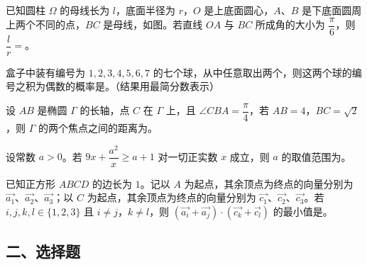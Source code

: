 \begin{question}
已知圆柱 $\Omega$ 的母线长为 $l$，底面半径为 $r$，$O$ 是上底面圆心，$A$、$B$ 是下底面圆周上两个不同的点，$BC$ 是母线，如图。若直线 $OA$ 与 $BC$ 所成角的大小为 $\dfrac{\pi}{6}$，则 $\dfrac lr=$\gkblank{}。
\nopagebreak[4]
\begin{center}\end{center}
\nopagebreak[4]
\end{question}
\endgroup
\begin{question}
盒子中装有编号为 $1,2,3,4,5,6,7$ 的七个球，从中任意取出两个，则这两个球的编号之积为偶数的概率是\gkblank{}。（结果用最简分数表示）

\end{question}
\begin{question}
设 $AB$ 是椭圆 $\Gamma$ 的长轴，点 $C$ 在 $\Gamma$ 上，且 $\angle CBA=\dfrac{\pi}{4}$，若 $AB=4$，$BC=\sqrt2$，则 $\Gamma$ 的两个焦点之间的距离为\gkblank{}。

\end{question}
\begin{question}
设常数 $a>0$。若 $9x+\dfrac{a^2}{x}\geqslant a+1$ 对一切正实数 $x$ 成立，则 $a$ 的取值范围为\gkblank{}。

\end{question}
\begin{question}
已知正方形 $ABCD$ 的边长为 $1$。记以 $A$ 为起点，其余顶点为终点的向量分别为 $\overrightarrow{a_1}$、$\overrightarrow{a_2}$、$\overrightarrow{a_3}$；以 $C$ 为起点，其余顶点为终点的向量分别为 $\overrightarrow{c_1}$、$\overrightarrow{c_2}$、$\overrightarrow{c_3}$。若 $i,j,k,l\in\{1,2,3\}$ 且 $i\neq j$，$k\neq l$，则 $(\overrightarrow{a_i}+\overrightarrow{a_j})\cdot(\overrightarrow{c_k}+\overrightarrow{c_l})$ 的最小值是\gkblank{}。

\end{question}
\begingroup
\renewcommand{\gkpart}[1]{\Needspace{0.4\textheight}\subsection*{#1}\nopagebreak}
\gkpart{二、选择题}
\endgroup

